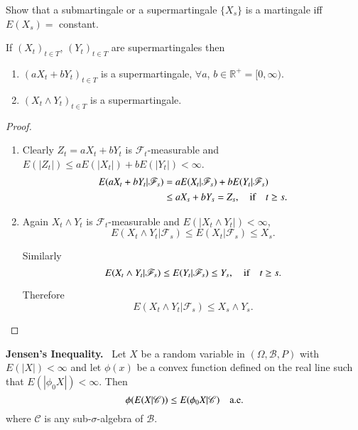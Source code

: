 \begin{exer*}
Show that a submartingale or a supermartingale $\{X_{s}\}$ is a
martingale iff $E(X_{s})=$ constant.
\end{exer*}

\begin{theorem*}
If $(X_{t})_{t\in T}$, $(Y_{t})_{t\in T}$ are supermartingales then 
\begin{enumerate}
\renewcommand{\theenumi}{\roman{enumi}}
\renewcommand{\labelenumi}{(\theenumi)}
\item $(aX_{t}+bY_{t})_{t\in T}$ is a supermartingale, $\forall a$,
  $b\in \mathbb{R}^{+}=[0,\infty)$.

\item $(X_{t}\wedge Y_{t})_{t\in T}$ is a supermartingale.
\end{enumerate}
\end{theorem*}

\begin{proof}
\begin{enumerate}
\renewcommand{\theenumi}{\roman{enumi}}
\renewcommand{\labelenumi}{(\theenumi)}
\item Clearly $Z_{t}=aX_{t}+bY_{t}$ is $\mathscr{F}_{t}$-measurable
  and $E(|Z_{t}|)\leq aE(|X_{t}|)+bE(|Y_{t}|)<\infty$.
\begin{align*}
E(aX_{t}+bY_{t}|\mathscr{F}_{s}) &=
aE(X_{t}|\mathscr{F}_{s})+bE(Y_{t}|\mathscr{F}_{s})\\
&\leq aX_{s}+bY_{s}=Z_{s},\quad\text{if}\quad t\geq s.
\end{align*}

\item Again $X_{t}\wedge Y_{t}$ is $\mathscr{F}_{t}$-measurable and
  $E(|X_{t}\wedge Y_{t}|)<\infty$,
$$
E(X_{t}\wedge Y_{t}|\mathscr{F}_{s})\leq E(X_{t}|\mathscr{F}_{s})\leq
X_{s}. 
$$

Similarly\pageoriginale
$$
E(X_{t}\wedge Y_{t}|\mathscr{F}_{s})\leq E(Y_{t}|\mathscr{F}_{s})\leq
Y_{s},\quad\text{if}\quad t\geq s.
$$

Therefore
$$
E(X_{t}\wedge Y_{t}|\mathscr{F}_{s})\leq X_{s}\wedge Y_{s}.
$$
\end{enumerate}
\end{proof}

\noindent
{\bf Jensen's Inequality.}~ Let $X$ be a random variable in
$(\Omega,\mathscr{B},P)$ with\break $E(|X|)<\infty$ and let $\phi(x)$ be a
convex function defined on the real line such that
$E(|\phi_{0}X|)<\infty$. Then
$$
\phi(E(X|\mathscr{C}))\leq E(\phi_{0}X|\mathscr{C})\quad\text{a.e.}
$$
where $\mathscr{C}$ is any sub-$\sigma$-algebra of $\mathscr{B}$.

